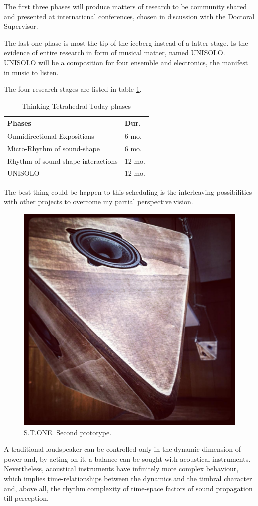 \documentclass[
	12pt,
	a4paper,
	twocolumn
	]{article}
\begin{document}
The first three phases will produce matters of research to be community shared and presented at international conferences, chosen in discussion with the Doctoral Supervisor.

The last-one phase is most the tip of the iceberg instead of a latter stage. Is the evidence of entire research in form of musical matter, named UNISOLO. UNISOLO will be a composition for four ensemble and electronics, the manifest in music to listen. 

The four research stages are listed in table \ref{timesheet}.

\begin{table}[htp]
\begin{center}
\begin{tabular}{ll}
\textbf{Phases} & \textbf{Dur.} \\
\hline
Omnidirectional Expositions & 6 mo. \\
Micro-Rhythm of sound-shape & 6 mo. \\
Rhythm of sound-shape interactions & 12 mo. \\
UNISOLO & 12 mo. 
\end{tabular}
\label{timesheet}
\caption{Thinking Tetrahedral Today phases}
\end{center}
\end{table}%

The best thing could be happen to this scheduling is the interleaving possibilities with other projects to overcome my partial perspective vision. 

\begin{figure}[htbp]
\begin{center}
\includegraphics[width=.47\textwidth]{img/13556748_1807931906092757_1243460980_n.jpg}
\caption{S.T.ONE. Second prototype.}
\label{stone2}
\end{center}
\end{figure}

A traditional loudspeaker can be controlled only in the dynamic dimension of power and, by acting on it, a balance can be sought with acoustical instruments. Nevertheless, acoustical instruments have infinitely more complex behaviour, which implies time-relationships between the dynamics and the timbral character and, above all, the rhythm complexity of time-space factors of sound propagation till perception.
\end{document}
